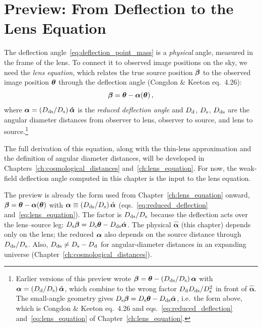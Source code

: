 \section{Preview: From Deflection to the Lens Equation}
\label{sec:preview_lens_equation}

The deflection angle~\eqref{eq:deflection_point_mass} is a
\emph{physical} angle, measured in the frame of the lens.  To connect
it to observed image positions on the sky, we need the
\emph{lens equation}, which relates the true source position
$\boldsymbol{\beta}$ to the observed image position $\boldsymbol{\theta}$ through the
deflection angle (Congdon \& Keeton eq.~4.26):
\begin{equation}
    \boldsymbol{\beta} = \boldsymbol{\theta} - \boldsymbol{\alpha}(\boldsymbol{\theta}) \,,
    \label{eq:lens_equation_preview}
\end{equation}
where $\boldsymbol{\alpha} = (D_{\mathrm{ds}} / D_{\mathrm{s}})\, \boldsymbol{\hat{\alpha}}$ is the
\emph{reduced deflection angle} and $D_{\mathrm{d}}$, $D_{\mathrm{s}}$, $D_{\mathrm{ds}}$ are the
angular diameter distances from observer to lens, observer to source,
and lens to source.\footnote{Earlier versions of this preview wrote
$\boldsymbol{\beta} = \boldsymbol{\theta} - (D_{\mathrm{ds}}/D_{\mathrm{s}})\,\boldsymbol{\alpha}$ with
$\boldsymbol{\alpha} = (D_{\mathrm{d}}/D_{\mathrm{s}})\,\hat{\boldsymbol\alpha}$, which combine to the
wrong factor $D_{\mathrm{d}}D_{\mathrm{ds}}/D_{\mathrm{s}}^2$ in front of $\hat{\boldsymbol\alpha}$.  The
small-angle geometry gives $D_{\mathrm{s}}\boldsymbol{\beta} = D_{\mathrm{s}}\boldsymbol{\theta} -
D_{\mathrm{ds}}\hat{\boldsymbol\alpha}$, i.e.\ the form above, which is Congdon \&
Keeton eq.~4.26 and eqs.~\eqref{eq:reduced_deflection}
and~\eqref{eq:lens_equation} of Chapter~\ref{ch:lens_equation}.}

The full derivation of this equation, along with the thin-lens
approximation and the definition of angular diameter distances, will be
developed in Chapters~\ref{ch:cosmological_distances} and~\ref{ch:lens_equation}.  For now, the
weak-field deflection angle computed in this chapter is the
input to the lens equation.

\begin{annotation}
The preview is already the form used from Chapter~\ref{ch:lens_equation}
onward, $\boldsymbol{\beta} = \boldsymbol{\theta} - \boldsymbol{\alpha}(\boldsymbol{\theta})$ with
$\boldsymbol{\alpha} \equiv (D_{\mathrm{ds}}/D_{\mathrm{s}})\,\hat{\boldsymbol\alpha}$
(eqs.~\eqref{eq:reduced_deflection} and~\eqref{eq:lens_equation}).  The
factor is $D_{\mathrm{ds}}/D_{\mathrm{s}}$ because the deflection acts over the lens--source leg:
$D_{\mathrm{s}}\boldsymbol{\beta} = D_{\mathrm{s}}\boldsymbol{\theta} - D_{\mathrm{ds}}\hat{\boldsymbol\alpha}$.  The physical $\hat{\boldsymbol\alpha}$ (this
chapter) depends only on the lens; the reduced $\boldsymbol{\alpha}$ also depends on
the source distance through $D_{\mathrm{ds}}/D_{\mathrm{s}}$.  Also, $D_{\mathrm{ds}} \neq D_{\mathrm{s}} - D_{\mathrm{d}}$ for
angular-diameter distances in an expanding universe
(Chapter~\ref{ch:cosmological_distances}).
\end{annotation}

